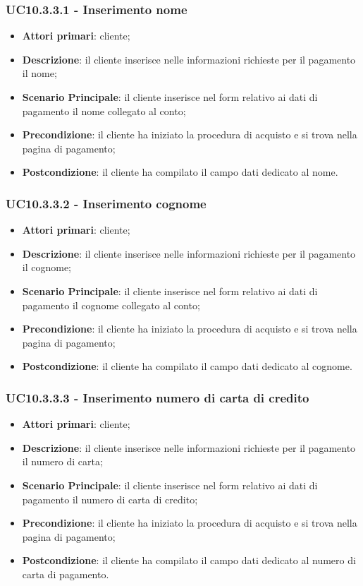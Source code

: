 \subsubsection{UC10.3.3.1 - Inserimento nome}
\begin{itemize}
\item \textbf{Attori primari}: cliente;
\item \textbf{Descrizione}: il cliente inserisce nelle informazioni richieste per il pagamento il nome;
\item \textbf{Scenario Principale}: il cliente inserisce nel form relativo ai dati di pagamento il nome collegato al conto;
\item \textbf{Precondizione}: il cliente ha iniziato la procedura di acquisto e si trova nella pagina di pagamento;
\item \textbf{Postcondizione}: il cliente ha compilato il campo dati dedicato al nome.
\end{itemize}

\subsubsection{UC10.3.3.2 - Inserimento cognome}
\begin{itemize}
\item \textbf{Attori primari}: cliente;
\item \textbf{Descrizione}: il cliente inserisce nelle informazioni richieste per il pagamento il cognome;
\item \textbf{Scenario Principale}: il cliente inserisce nel form relativo ai dati di pagamento il cognome collegato al conto;
\item \textbf{Precondizione}: il cliente ha iniziato la procedura di acquisto e si trova nella pagina di pagamento;
\item \textbf{Postcondizione}: il cliente ha compilato il campo dati dedicato al cognome.
\end{itemize}

\subsubsection{UC10.3.3.3 - Inserimento numero di carta di credito}
\begin{itemize}
\item \textbf{Attori primari}: cliente;
\item \textbf{Descrizione}: il cliente inserisce nelle informazioni richieste per il pagamento il numero di carta;
\item \textbf{Scenario Principale}: il cliente inserisce nel form relativo ai dati di pagamento il numero di carta di credito;
\item \textbf{Precondizione}: il cliente ha iniziato la procedura di acquisto e si trova nella pagina di pagamento;
\item \textbf{Postcondizione}: il cliente ha compilato il campo dati dedicato al numero di carta di pagamento.
\end{itemize}

